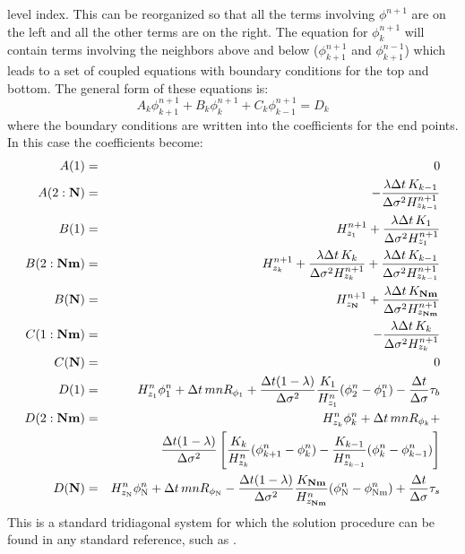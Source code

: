 level index.  This can be reorganized so that all the terms involving
$\phi^{n+1}$ are on the left and all the other terms are on the right.
The equation for $\phi_k^{n+1}$ will contain terms involving the neighbors
above and below ($\phi_{k+1}^{n+1}$ and $\phi_{k+1}^{n-1}$) which leads
to a set of coupled equations with boundary conditions for the top
and bottom.  The general form of these equations is: \begin{equation}
   A_k \phi_{k+1}^{n+1} + B_k \phi_k^{n+1} + C_k \phi_{k-1}^{n+1} = D_k
\end{equation} where the boundary conditions are written into the
coefficients for the end points.  In this case the coefficients become:
\begin{eqnarray}
   A(1) & = & 0 \\ A(2:{\bf N}) & = & - {\lambda \Delta t \, K_{k-1}
   \over \Delta \sigma^2 H^{n+1}_{z_{k-1}} } \\ B(1) & = & H^{n+1}_{z_1}
   + {\lambda \Delta t \, K_1 \over \Delta \sigma^2 H^{n+1}_{z_1} } \\
   B(2:{\bf Nm}) & = & H_{z_k}^{n+1} + {\lambda \Delta t \, K_k \over
   \Delta \sigma^2 H_{z_k}^{n+1} } + {\lambda \Delta t \, K_{k-1} \over
   \Delta \sigma^2 H^{n+1}_{z_{k-1}}}\\ B({\bf N}) & = & H^{n+1}_{z_{\bf
   N}} + {\lambda \Delta t \, K_{\bf Nm} \over
       \Delta \sigma^2 H^{n+1}_{z_{\bf Nm}} } \\
   C(1:{\bf Nm}) & = & - {\lambda \Delta t \, K_k \over \Delta \sigma^2
   H_{z_k}^{n+1} } \\ C({\bf N}) & = & 0 \\ D(1) & = & H^n_{z_1} \phi_1^n
   + \Delta t \, mn R_{{\phi}_1} + {\Delta t (1-\lambda) \over \Delta
   \sigma^2 }{ K_1 \over H^n_{z_1}} (\phi_2^n - \phi_1^n) - {\Delta t
   \over \Delta \sigma} \tau_b \\ D(2:{\bf Nm}) & = & H^n_{z_k} \phi_k^n +
   \Delta t \, mn R_{{\phi}_k} + \\ && {\Delta t (1-\lambda) \over \Delta
   \sigma^2 } \left[ { K_k \over H^n_{z_k}} (\phi_{k+1}^n - \phi_k^n)
   - { K_{k-1} \over H^n_{z_{k-1}}} (\phi_k^n - \phi_{k-1}^n) \right]
   \\ D({\bf N}) & = & H^n_{z_{\rm N}} \phi_{\rm N}^n + \Delta t \, mn
   R_{{\phi}_{\rm N}} - {\Delta t (1-\lambda) \over \Delta \sigma^2 } {
   K_{\bf Nm} \over H^n_{z_{\bf Nm}}} (\phi_{\rm N}^n - \phi_{\rm Nm}^n)
   + {\Delta t \over \Delta \sigma} \tau_s
\end{eqnarray} This is a standard tridiagonal system for which the
solution procedure can be found in any standard reference, such as
\citet{PFTV}.

